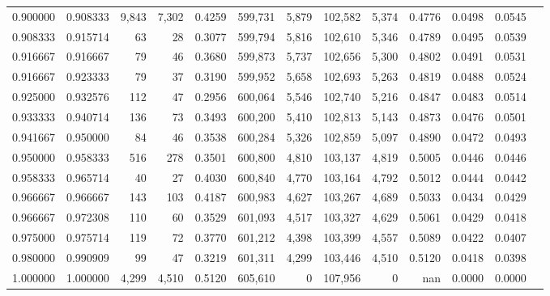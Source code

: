 \begin{tabular}{rrrrrrrrrrrrr}
0.900000 & 0.908333 &  9,843 &  7,302 &                                     0.4259 & 599,731 &   5,879 & 102,582 &   5,374 & 0.4776 & 0.0498 & 0.0545 \\
0.908333 & 0.915714 &     63 &     28 &                                     0.3077 & 599,794 &   5,816 & 102,610 &   5,346 & 0.4789 & 0.0495 & 0.0539 \\
0.916667 & 0.916667 &     79 &     46 &                                     0.3680 & 599,873 &   5,737 & 102,656 &   5,300 & 0.4802 & 0.0491 & 0.0531 \\
0.916667 & 0.923333 &     79 &     37 &                                     0.3190 & 599,952 &   5,658 & 102,693 &   5,263 & 0.4819 & 0.0488 & 0.0524 \\
0.925000 & 0.932576 &    112 &     47 &                                     0.2956 & 600,064 &   5,546 & 102,740 &   5,216 & 0.4847 & 0.0483 & 0.0514 \\
0.933333 & 0.940714 &    136 &     73 &                                     0.3493 & 600,200 &   5,410 & 102,813 &   5,143 & 0.4873 & 0.0476 & 0.0501 \\
0.941667 & 0.950000 &     84 &     46 &                                     0.3538 & 600,284 &   5,326 & 102,859 &   5,097 & 0.4890 & 0.0472 & 0.0493 \\
0.950000 & 0.958333 &    516 &    278 &                                     0.3501 & 600,800 &   4,810 & 103,137 &   4,819 & 0.5005 & 0.0446 & 0.0446 \\
0.958333 & 0.965714 &     40 &     27 &                                     0.4030 & 600,840 &   4,770 & 103,164 &   4,792 & 0.5012 & 0.0444 & 0.0442 \\
0.966667 & 0.966667 &    143 &    103 &                                     0.4187 & 600,983 &   4,627 & 103,267 &   4,689 & 0.5033 & 0.0434 & 0.0429 \\
0.966667 & 0.972308 &    110 &     60 &                                     0.3529 & 601,093 &   4,517 & 103,327 &   4,629 & 0.5061 & 0.0429 & 0.0418 \\
0.975000 & 0.975714 &    119 &     72 &                                     0.3770 & 601,212 &   4,398 & 103,399 &   4,557 & 0.5089 & 0.0422 & 0.0407 \\
0.980000 & 0.990909 &     99 &     47 &                                     0.3219 & 601,311 &   4,299 & 103,446 &   4,510 & 0.5120 & 0.0418 & 0.0398 \\
1.000000 & 1.000000 &  4,299 &  4,510 &                                     0.5120 & 605,610 &       0 & 107,956 &       0 &    nan & 0.0000 & 0.0000 \\
\bottomrule
\end{tabular}
